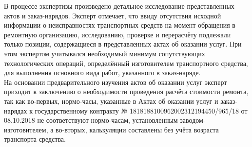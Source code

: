 %

В процессе экспертизы   произведено детальное исследование представленных актов и заказ-нарядов. Эксперт отмечает, что ввиду отсутствия исходной информации о неисправностях транспортных средств на момент обращения в ремонтную организацию, исследованию, проверке и перерасчёту подлежали только  позиции, содержащиеся в представленных актах об оказании услуг. При этом экспертом учитывался необходимый минимум сопутствующих технологических операций, определённый изготовителем транспортного средства, для выполнения основного вида работ, указанного в заказ-наряде.\\

На основании предварительного изучения актов об оказании услуг эксперт приходит к заключению о необходимости проведения расчёта стоимости ремонта, так как 
во-первых, нормо-часы, указанные в Актах об оказании услуг и заказ-нарядах к государственному контракту № 1818188100962002312194450/965/18 от 08.10.2018 не соответствуют  нормо-часам, установленным заводом-изготовителем, а во-вторых, калькуляции составлены без учёта возраста транспорта средства.\\



